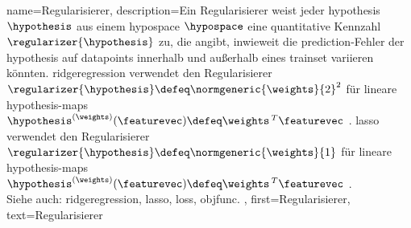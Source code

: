 {{{{
{name={Regularisierer}, 
 description={Ein Regularisierer 
  weist jeder \gls{hypothesis} $\hypothesis$ aus einem \gls{hypospace} $\hypospace$ eine quantitative 
  Kennzahl $\regularizer{\hypothesis}$ zu, die angibt, inwieweit die \gls{prediction}-Fehler der \gls{hypothesis} 
  auf \glspl{datapoint} innerhalb und außerhalb eines \gls{trainset} variieren könnten. 
  \Gls{ridgeregression} verwendet den Regularisierer $\regularizer{\hypothesis} \defeq \normgeneric{\weights}{2}^{2}$ 
  für lineare \gls{hypothesis}-\glspl{map} $\hypothesis^{(\weights)}(\featurevec) \defeq \weights\,^{T} \featurevec$ 
  \cite[Kap. 3]{MLBasics}. 
  \Gls{lasso} verwendet den Regularisierer $\regularizer{\hypothesis} \defeq \normgeneric{\weights}{1}$ 
  für lineare \gls{hypothesis}-\glspl{map} $\hypothesis^{(\weights)}(\featurevec) \defeq \weights\,^{T} \featurevec$ 
  \cite[Kap. 3]{MLBasics}.
   \\
  Siehe auch: \gls{ridgeregression}, \gls{lasso}, \gls{loss}, \gls{objfunc}. },
 first={Regularisierer},
 text={Regularisierer}
}

}}}}
